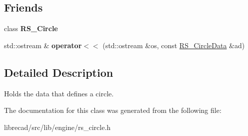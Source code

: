 \subsection*{Friends}
\begin{DoxyCompactItemize}
\item 
\hypertarget{classRS__CircleData_a1e56fbcafce84435520d03b813482495}{class {\bfseries R\-S\-\_\-\-Circle}}\label{classRS__CircleData_a1e56fbcafce84435520d03b813482495}

\item 
\hypertarget{classRS__CircleData_a4e52d2819694c3d3e244f9fd5eccf74d}{std\-::ostream \& {\bfseries operator$<$$<$} (std\-::ostream \&os, const \hyperlink{classRS__CircleData}{R\-S\-\_\-\-Circle\-Data} \&ad)}\label{classRS__CircleData_a4e52d2819694c3d3e244f9fd5eccf74d}

\end{DoxyCompactItemize}


\subsection{Detailed Description}
Holds the data that defines a circle. 

The documentation for this class was generated from the following file\-:\begin{DoxyCompactItemize}
\item 
librecad/src/lib/engine/rs\-\_\-circle.\-h\end{DoxyCompactItemize}
